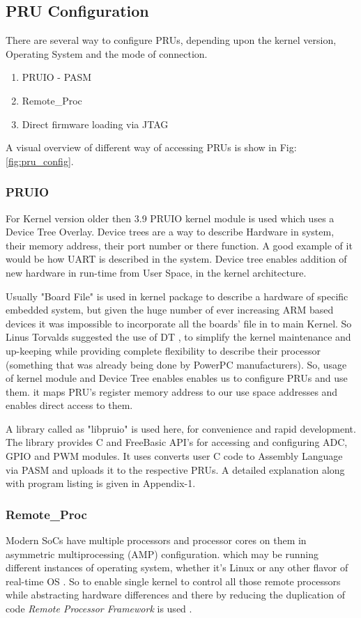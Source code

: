 \subsection{PRU Configuration}
There are several way to configure PRUs, depending upon the kernel version, Operating System and the mode of connection.
\begin{enumerate}
	\item PRUIO - PASM 
	\item Remote\_Proc
	\item Direct firmware loading via JTAG
\end{enumerate}

A visual overview of different way of accessing PRUs is show in Fig: \ref{fig:pru_config}.
\subsubsection{PRUIO}
 For Kernel version older then 3.9 PRUIO kernel module is used which uses a Device Tree Overlay. Device trees are a way to describe Hardware in system, their memory address, their port number or there function. A good example of it would be how UART is described in the system. Device tree enables addition of new hardware in run-time from User Space, in the kernel architecture. 
 
 Usually "Board File" is used in kernel package to describe a hardware of specific embedded system, but given the huge number of ever increasing ARM based devices it was impossible to incorporate all the boards' file in to main Kernel. So Linus Torvalds \cite{DThist} suggested the use of DT , to simplify the kernel maintenance and up-keeping while providing complete flexibility to describe their processor (something that was already being done by PowerPC manufacturers). So, usage of kernel module and Device Tree enables enables us to configure PRUs and use them. it maps PRU's register memory address to our use space addresses and enables direct access to them. 
 
 A library  called as "libpruio" \cite{libpruio} is used here, for convenience and rapid development. The library provides C and FreeBasic API's for accessing and configuring ADC, GPIO and PWM modules. It uses converts user C code to Assembly Language via PASM and uploads it to the respective PRUs. A detailed explanation along with program listing is given in Appendix-1.
 
 \subsubsection{Remote\_Proc}
 Modern SoCs have multiple processors and processor cores on them in asymmetric multiprocessing (AMP) configuration. which may be running different instances  of operating system, whether it's Linux or any other flavor of real-time OS  . So to enable single kernel to control all those remote processors while abstracting hardware differences and there by reducing the duplication of code \textit{Remote Processor Framework} is used \cite{remoteproc}.
 
